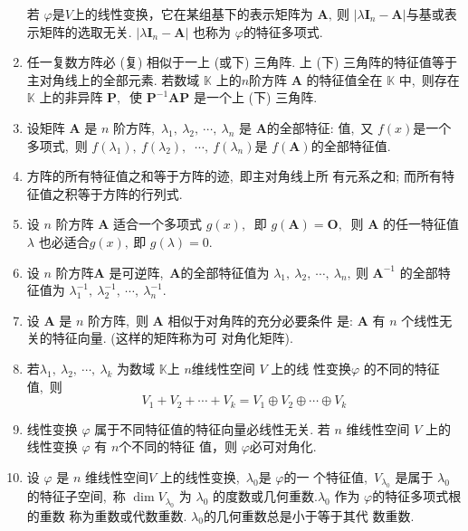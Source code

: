 \begin{enumerate}
		若 $ \varphi  $是$  V  $上的线性变换，它在某组基下的表示矩阵为  $\boldsymbol{A} ,\  $则  $\left|\lambda \boldsymbol{I}_{n}-\boldsymbol{A}\right|  $与基或表示矩阵的选取无关.  $\left|\lambda \boldsymbol{I}_{n}-\boldsymbol{A}\right| $ 也称为  $\varphi  $的特征多项式.
		\item 任一复数方阵必 (复) 相似于一上 (或下) 三角阵.
		上 (下) 三角阵的特征值等于主对角线上的全部元素.
		若数域 $ \mathbb{K}$  上的$  n  $阶方阵  $\boldsymbol{A} $ 的特征值全在  $\mathbb{K} $ 中,\  则存在  $\mathbb{K} $ 上的非异阵  $\boldsymbol{P} ,\ $ 使  $\boldsymbol{P}^{-1} \boldsymbol{A P}$  是一个上 (下) 三角阵.
		\item 设矩阵  $\boldsymbol{A} $ 是 $ n$  阶方阵,\  $ \lambda_{1},\  \lambda_{2},\  \cdots,\  \lambda_{n}$  是  $\boldsymbol{A}  $的全部特征: 值,\  又  $f(x)  $是一个多项式,\  则  $f\left(\lambda_{1}\right),\  f\left(\lambda_{2}\right),\ $ $\cdots,\  f\left(\lambda_{n}\right)  $是  $f(\boldsymbol{A})  $的全部特征值.
		\item 方阵的所有特征值之和等于方阵的迹,\  即主对角线上所 有元系之和; 而所有特征值之积等于方阵的行列式.
		\item 设  $n$  阶方阵  $\boldsymbol{A} $ 适合一个多项式 $ g(x) ,\ $ 即  $g(\boldsymbol{A})=\boldsymbol{O} ,\ $ 则  $\boldsymbol{A} $ 的任一特征值  $\lambda $ 也必适合$  g(x) ,\  $即  $g(\lambda)=0 .$
		\item 设 $ n$  阶方阵$  \boldsymbol{A}$  是可逆阵,\ $  \boldsymbol{A}  $的全部特征值为 $ \lambda_{1},\  \lambda_{2} ,\   \cdots,\  \lambda_{n} ,\  $则  $\boldsymbol{A}^{-1} $ 的全部特征值为 $ \lambda_{1}^{-1},\  \lambda_{2}^{-1},\  \cdots,\  \lambda_{n}^{-1} .$
		\item 设  $\boldsymbol{A} $ 是  $n $ 阶方阵,\  则  $\boldsymbol{A} $ 相似于对角阵的充分必要条件 是: $ \boldsymbol{A}$  有 $ n$  个线性无关的特征向量. (这样的矩阵称为可 对角化矩阵).
		\item 若$  \lambda_{1},\  \lambda_{2},\  \cdots,\  \lambda_{k}$  为数域  $\mathbb{K}  $上 $ n  $维线性空间  $V $ 上的线 性变换$  \varphi $ 的不同的特征值,\  则
		$$V_{1}+V_{2}+\cdots+V_{k}=V_{1} \oplus V_{2} \oplus \cdots \oplus V_{k}$$
		\item 线性变换 $ \varphi $ 属于不同特征值的特征向量必线性无关. 若 $ n$  维线性空间  $V$  上的线性变换  $\varphi $ 有 $ n  $个不同的特征 值，则  $\varphi  $必可对角化.
		\item 设 $ \varphi $ 是  $n$  维线性空间$  V $ 上的线性变换,\   $\lambda_{0}  $是  $\varphi  $的一 个特征值,\   $V_{\lambda_{0}} $ 是属于  $\lambda_{0} $ 的特征子空间,\  称  $\operatorname{dim} V_{\lambda_{0}} $ 为  $\lambda_{0}$  的度数或几何重数.$  \lambda_{0} $ 作为 $ \varphi  $的特征多项式根的重数 称为重数或代数重数. $ \lambda_{0}  $的几何重数总是小于等于其代 数重数.

\end{enumerate}

